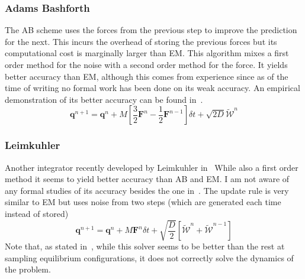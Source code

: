 \documentclass[twoside,openright,titlepage,numbers=noenddot,%
headinclude,footinclude,cleardoublepage=empty,abstract=on,
BCOR=5mm,fontsize=11pt, dvipsnames, paper=b5
]{scrreprt}
\renewcommand{\vec}[1]{\bm{#1}}
\newcommand{\dt}{\delta t}
\newcommand{\half}{\frac{1}{2}}
\newcommand{\noise}{\widetilde{W}}
\newcommand{\ppos}{q}
\begin{document}
\subsubsection*{Adams Bashforth}
The \gls{AB} scheme uses the forces from the previous step to improve the prediction for the next. This incurs the overhead of storing the previous forces but its computational cost is marginally larger than \gls{EM}. This algorithm mixes a first order method for the noise with a second order method for the force. It yields better accuracy than \gls{EM}, although this comes from experience since as of the time of writing no formal work has been done on its weak accuracy. An empirical demonstration of its better accuracy can be found in~\cite{Balboa2017}.
\begin{equation}
  \vec{\ppos}^{n+1} = \vec{\ppos}^n + M\left[\frac{3}{2}\vec{F}^n - \half \vec{F}^{n-1}\right]\dt + \sqrt{2D}\vec{\mathcal{\noise}}^n
\end{equation}

\subsubsection*{Leimkuhler}
Another integrator recently developed by Leimkuhler in~\cite{Leimkuhler2015}
 While also a first order method it seems to yield better accuracy than \gls{AB} and \gls{EM}. I am not aware of any formal studies of its accuracy besides the one in~\cite{Leimkuhler2014}.
 The update rule is very similar to \gls{EM} but uses noise from two steps (which are generated each time instead of stored)
 \begin{equation}
  \vec{\ppos}^{n+1} = \vec{\ppos}^n + M\vec{F}^n\dt + \sqrt{\frac{D}{2}}\left[\vec{\mathcal{\noise}}^n + \vec{\mathcal{\noise}}^{n-1}\right]
\end{equation}
Note that, as stated in~\cite{Leimkuhler2015}, while this solver seems to be better than the rest at sampling equilibrium configurations, it does not correctly solve the dynamics of the problem.
\end{document}

